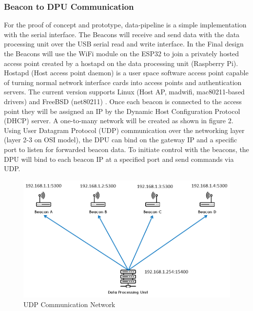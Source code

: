 \pagebreak
\subsubsection{Beacon to DPU Communication}
\medskip
For the proof of concept and prototype, data-pipeline is a simple implementation with the serial interface. The Beacons will receive and send data with the data processing unit over the USB serial read and write interface. In the Final design the Beacons will use the WiFi module on the ESP32 to join a privately hosted access point created by a hostapd on the data processing unit (Raspberry Pi). \Gls{Hostapd} (Host access point daemon) is a user space software access point capable of turning normal network interface cards into access points and authentication servers. The current version supports Linux (Host AP, madwifi, mac80211-based drivers) and FreeBSD (net80211) \cite{R4-1-2-1}. Once each beacon is connected to the access point they will be assigned an IP by the Dynamic Host Configuration Protocol (\Gls{DHCP}) server. A one-to-many network will be created as shown in figure 2. Using User Datagram Protocol (UDP) communication over the networking layer (layer 2-3 on OSI model), the DPU can bind on the gateway IP and a specific port to listen for forwarded beacon data. To initiate control with the beacons, the DPU will bind to each beacon IP at a specified port and send commands via UDP.

\medskip
\begin{figure}[H]
\centering
    \includegraphics[width=\linewidth]{./images/UDP.png}
    \caption{UDP Communication Network}
    \label{udp}
\end{figure}
\medskip



\pagebreak
